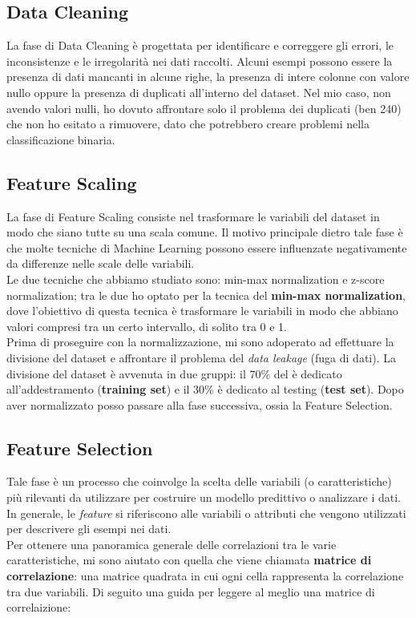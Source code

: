 \documentclass{article}
\begin{document}
\begin{titlepage}
        \subsection{Data Cleaning}
        La fase di Data Cleaning  è progettata per identificare e correggere gli errori, le inconsistenze e le irregolarità nei dati raccolti. Alcuni esempi possono essere la presenza di dati mancanti in alcune righe, la presenza di intere colonne con valore nullo oppure la presenza di duplicati all'interno del dataset. Nel mio caso, non avendo valori nulli, ho dovuto affrontare solo il problema dei duplicati (ben 240) che non ho esitato a rimuovere, dato che potrebbero creare problemi nella classificazione binaria. 

        
        \subsection{Feature Scaling}
        La fase di Feature Scaling consiste nel trasformare le variabili del dataset in modo che siano tutte su una scala comune. Il motivo principale dietro tale fase è che molte tecniche di Machine Learning possono essere influenzate negativamente da differenze nelle scale delle variabili. \\Le due tecniche che abbiamo studiato sono: min-max normalization e z-score normalization; tra le due ho optato per la tecnica del \textbf{min-max normalization}, dove l'obiettivo di questa tecnica è trasformare le variabili in modo che abbiano valori compresi tra un certo intervallo, di solito tra 0 e 1. \\Prima di proseguire con la normalizzazione, mi sono adoperato ad effettuare la divisione del dataset e affrontare il problema del \textit{data leakage} (fuga di dati). La divisione del dataset è avvenuta in due gruppi: il 70\% del è dedicato all'addestramento (\textbf{training set}) e il 30\% è dedicato al testing (\textbf{test set}).
        Dopo aver normalizzato posso passare alla fase successiva, ossia la Feature Selection.

        \subsection{Feature Selection}
        Tale fase è un processo che coinvolge la scelta delle variabili (o caratteristiche) più rilevanti da utilizzare per costruire un modello predittivo o analizzare i dati. In generale, le \textit{feature} si riferiscono alle variabili o attributi che vengono utilizzati per descrivere gli esempi nei dati. \\
        Per ottenere una panoramica generale delle correlazioni tra le varie caratteristiche, mi sono aiutato con quella che viene chiamata \textbf{matrice di correlazione}: una matrice quadrata in cui ogni cella rappresenta la correlazione tra due variabili. Di seguito una guida per leggere al meglio una matrice di correlaizione:
        

\end{titlepage}
\end{document}
